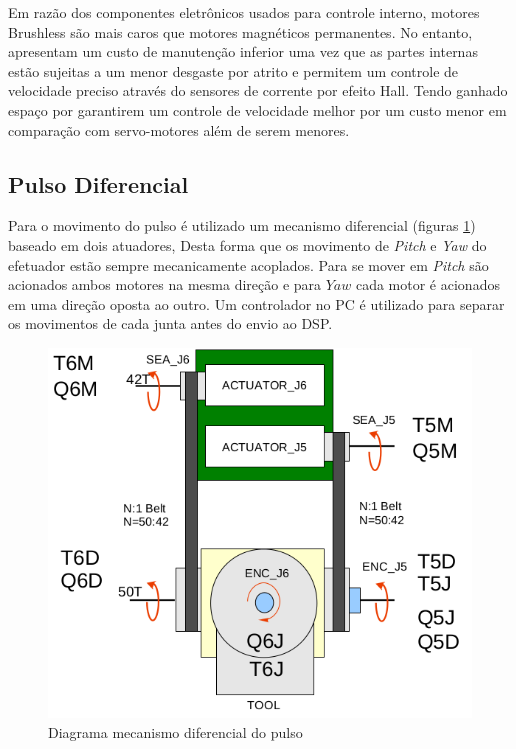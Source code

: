 Em razão dos componentes eletrônicos usados para controle interno, motores Brushless são mais caros que motores magnéticos permanentes. No entanto, apresentam um custo de manutenção inferior uma vez que as partes internas estão sujeitas a um menor desgaste por atrito e permitem um controle de velocidade preciso através do sensores de corrente por efeito Hall. Tendo ganhado espaço por garantirem um controle de velocidade melhor por um custo menor em comparação com servo-motores além de serem menores. %


\subsection{Pulso Diferencial}

Para o movimento do pulso é utilizado um mecanismo diferencial (figuras \ref{fig:meka-wrist}) baseado em dois atuadores, Desta forma que os movimento de \textit{Pitch} e \textit{Yaw} do efetuador estão sempre mecanicamente acoplados. Para se mover em \textit{Pitch} são acionados ambos motores na mesma direção e para $Yaw$ cada motor é acionados em uma direção oposta ao outro. Um controlador no PC é utilizado para separar os movimentos de cada junta antes do envio ao DSP.

\begin{figure}[H]
    \centering
    \includegraphics[width = 0.6\linewidth]{tex/figs/meka_wrist.png}
    \caption{Diagrama mecanismo diferencial do pulso \cite{mekartfd}}
    \label{fig:meka-wrist}
\end{figure}

